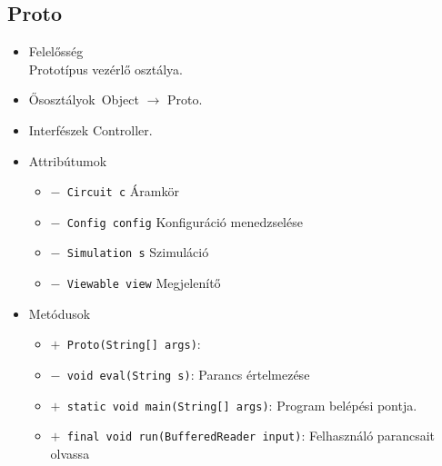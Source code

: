 \subsection{Proto}
\begin{itemize}
\item Felelősség\\
Prototípus vezérlő osztálya.
\item Ősosztályok\ Object $\rightarrow{}$ Proto.
\item Interfészek Controller.
\item Attribútumok $\ $
\begin{itemize}
	\item[] \texttt{$-$ Circuit c} Áramkör
	\item[] \texttt{$-$ Config config} Konfiguráció menedzselése
	\item[] \texttt{$-$ Simulation s} Szimuláció
	\item[] \texttt{$-$ Viewable view} Megjelenítő
\end{itemize}
\item Metódusok$\ $
\begin{itemize}
	\item[] \texttt{$+$ Proto(String[] args)}: 
	\item[] \texttt{$-$ void eval(String s)}: Parancs értelmezése
	\item[] \texttt{$+$ static void main(String[] args)}: Program belépési pontja.
	\item[] \texttt{$+$ final void run(BufferedReader input)}: Felhasználó parancsait olvassa
\end{itemize}
\end{itemize}

